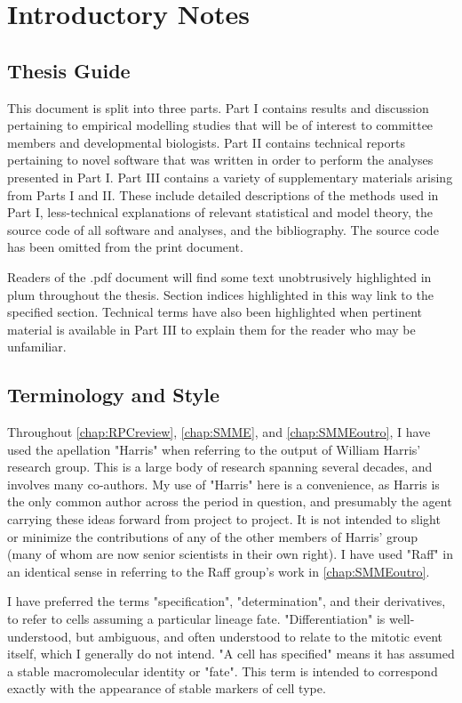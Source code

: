 \section*{Introductory Notes}
\label{ch:intro}

\subsection*{Thesis Guide}
This document is split into three parts. Part I contains results and discussion pertaining to empirical modelling studies that will be of interest to committee members and developmental biologists. Part II contains technical reports pertaining to novel software that was written in order to perform the analyses presented in Part I. Part III contains a variety of supplementary materials arising from Parts I and II. These include detailed descriptions of the methods used in Part I, less-technical explanations of relevant statistical and model theory, the source code of all software and analyses, and the bibliography. The source code has been omitted from the print document.

Readers of the .pdf document will find some text unobtrusively highlighted in plum throughout the thesis. Section indices highlighted in this way link to the specified section. Technical terms have also been highlighted when pertinent material is available in Part III to explain them for the reader who may be unfamiliar.

\subsection*{Terminology and Style}
Throughout \autoref{chap:RPCreview}, \autoref{chap:SMME}, and \autoref{chap:SMMEoutro}, I have used the apellation "Harris" when referring to the output of William Harris' research group. This is a large body of research spanning several decades, and involves many co-authors. My use of "Harris" here is a convenience, as Harris is the only common author across the period in question, and presumably the agent carrying these ideas forward from project to project. It is not intended to slight or minimize the contributions of any of the other members of Harris' group (many of whom are now senior scientists in their own right). I have used "Raff" in an identical sense in referring to the Raff group's work in \autoref{chap:SMMEoutro}.

I have preferred the terms "specification", "determination", and their derivatives, to refer to cells assuming a particular lineage fate. "Differentiation" is well-understood, but ambiguous, and often understood to relate to the mitotic event itself, which I generally do not intend. "A cell has specified" means it has assumed a stable macromolecular identity or "fate". This term is intended to correspond exactly with the appearance of stable markers of cell type.

